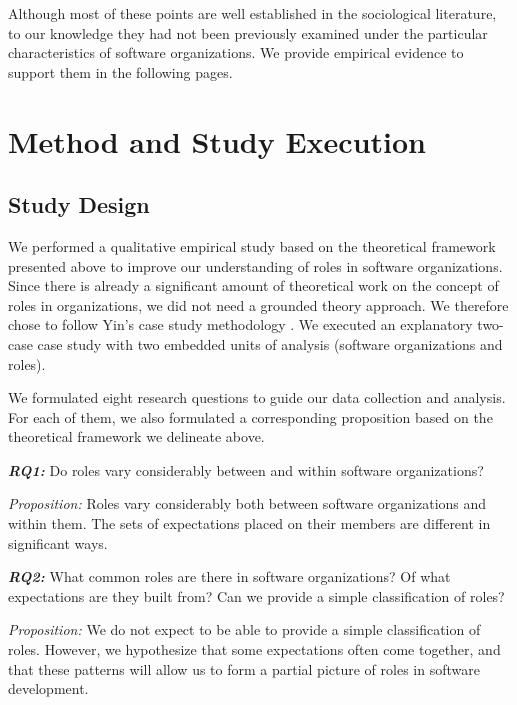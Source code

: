 \documentclass[10pt, conference, compsocconf]{IEEEtran}
\begin{document}
Although most of these points are well established in the sociological literature, to our knowledge they had not been previously examined under the particular characteristics of software organizations. We provide empirical evidence to support them in the following pages.






\section{Method and Study Execution}

\subsection{Study Design}

We performed a qualitative empirical study based on the theoretical framework presented above to improve our understanding of roles in software organizations. Since there is already a significant amount of theoretical work on the concept of roles in organizations, we did not need a grounded theory approach. We therefore chose to follow Yin's case study methodology \cite{Yin2003}. We executed an explanatory two-case case study with two embedded units of analysis (software organizations and roles).

We formulated eight research questions to guide our data collection and analysis. For each of them, we also formulated a corresponding proposition based on the theoretical framework we delineate above.

\textbf{\emph{RQ1:}} Do roles vary considerably between and within software organizations?

\emph{Proposition:} Roles vary considerably both between software organizations and within them. The sets of expectations placed on their members are different in significant ways.

\textbf{\emph{RQ2:}} What common roles are there in software organizations? Of what expectations are they built from? Can we provide a simple classification of roles?

\emph{Proposition:} We do not expect to be able to provide a simple classification of roles. However, we hypothesize that some expectations often come together, and that these patterns will allow us to form a partial picture of roles in software development.
\end{document}

